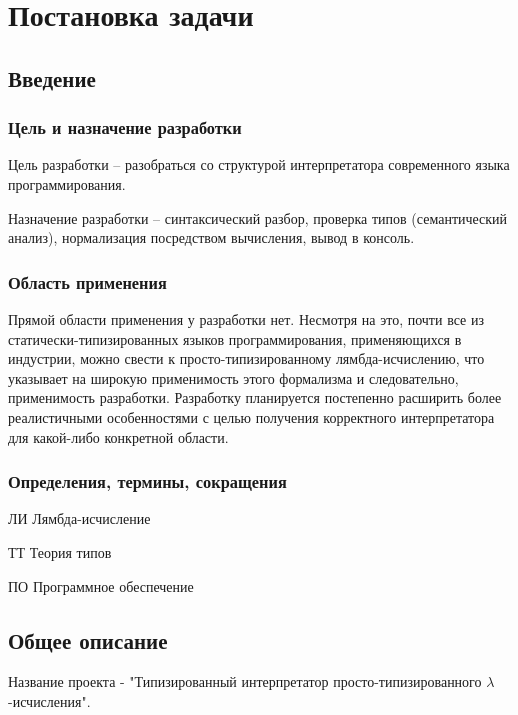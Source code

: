 \section{Постановка задачи}

\subsection{Введение}
\subsubsection{Цель и назначение разработки}

Цель разработки – разобраться со структурой интерпретатора современного языка программирования.

Назначение разработки – синтаксический разбор, проверка типов (семантический анализ), нормализация посредством вычисления, вывод в консоль.

\subsubsection{Область применения}

Прямой области применения у разработки нет. Несмотря на это, почти все из статически-типизированных языков программирования, применяющихся в индустрии, можно свести к просто-типизированному лямбда-исчислению, что указывает на широкую применимость этого формализма и следовательно, применимость разработки. Разработку планируется постепенно расширить более реалистичными особенностями с целью получения корректного интерпретатора для какой-либо конкретной области.

\subsubsection{Определения, термины, сокращения}

\begin{description}
  \item{ЛИ} Лямбда-исчисление
  \item{ТТ} Теория типов
  \item{ПО} Программное обеспечение
\end{description}

\subsection{Общее описание}

Название проекта - "Типизированный интерпретатор просто-типизированного $\lambda$-исчисления".

